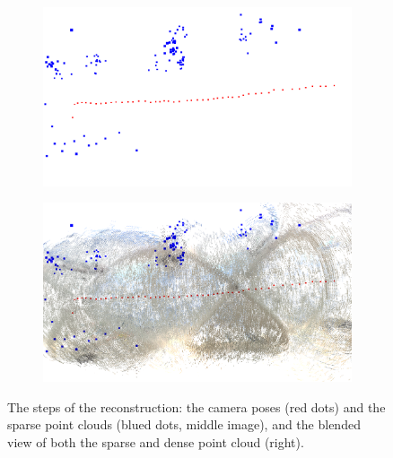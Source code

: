 \begin{figure}[h]
\centering
	\begin{subfigure}{0.45\linewidth}
		\centering
		\includegraphics[width=\linewidth]{img/real2.png}
	\end{subfigure}
	\begin{subfigure}{0.45\linewidth}
		\centering
		\includegraphics[width=\linewidth]{img/real3.png}
	\end{subfigure}
	\caption{The steps of the reconstruction: the camera poses
	(red dots) and the sparse point clouds (blued dots, middle image),
	and the blended view of both the sparse and dense point cloud (right).}
	\label{fig:reconstruction_steps}
\end{figure}
%
